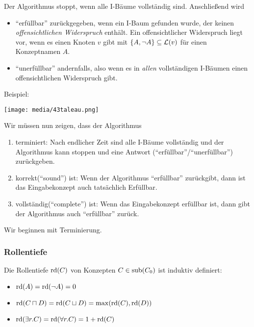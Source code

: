 Der Algorithmus stoppt, wenn alle I-Bäume vollständig sind. Anschließend wird
\begin{itemize}
    \item \enquote{erfüllbar} zurückgegeben, wenn ein I-Baum gefunden wurde, der keinen \emph{offensichtlichen Widerspruch} enthält. Ein offensichtlicher Widerspruch liegt vor, wenn es einen Knoten $v$ gibt mit $\left\{A, \neg A\right\} \subseteq \ML(v)$ für einen Konzeptnamen $A$.
    \item \enquote{unerfüllbar} andernfalls, also wenn es in \emph{allen} vollständigen I-Bäumen einen offensichtlichen Widerspruch gibt.
\end{itemize}

\begin{tafel}

Beispiel:

\texttt{[image: media/43taleau.png]}

\end{tafel}

Wir müssen nun zeigen, dass der Algorithmus
\begin{enumerate}
    \item terminiert:
        Nach endlicher Zeit sind alle I-Bäume vollständig und der Algorithmus kann stoppen und eine Antwort (\enquote{erfüllbar}/\enquote{unerfüllbar}) zurückgeben.
    \item korrekt(\enquote{sound}) ist:
        Wenn der Algorithmus \enquote{erfüllbar} zurückgibt, dann ist das Eingabekonzept auch tatsächlich Erfüllbar.
    \item vollständig(\enquote{complete}) ist:
        Wenn das Eingabekonzept erfüllbar ist, dann gibt der Algorithmus auch \enquote{erfüllbar} zurück.
\end{enumerate}

Wir beginnen mit Terminierung.

\subsubsection{Rollentiefe}
\label{sec:def-rollentiefe}

Die Rollentiefe $\rd\left(C\right)$ von Konzepten
$C \in \sub\left( C_{0} \right)$ ist induktiv definiert:

\begin{itemize}
\item
  $\rd\left( A \right) = \rd\left( \neg A \right) = 0$
\item
  $\rd\left( C \sqcap D \right) = \rd\left( C \sqcup D \right) = \max\left( \rd\left( C \right),\rd\left( D \right) \right)$
\item
  $\rd\left( \exists r.C \right) = \rd\left( \forall r.C \right) = 1 + \rd\left( C \right)$
\end{itemize}

